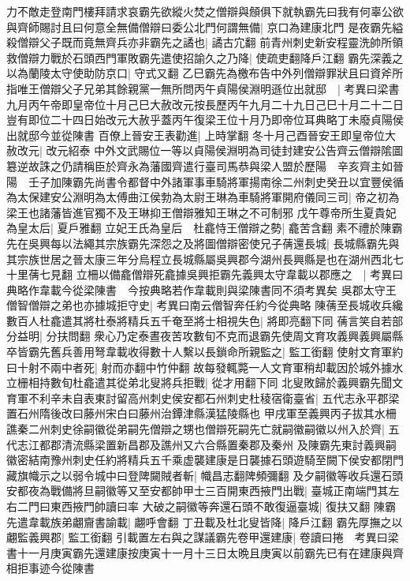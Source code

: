 力不敵走登南門樓拜請求哀霸先欲縱火焚之僧辯與頠俱下就執霸先曰我有何辜公欲與齊師賜討且曰何意全無備僧辯曰委公北門何謂無備|{
	京口為建康北門}
是夜霸先縊殺僧辯父子既而竟無齊兵亦非霸先之譎也|{
	譎古宂翻}
前青州刺史新安程靈洗帥所領救僧辯力戰於石頭西門軍敗霸先遣使招諭久之乃降|{
	使疏吏翻降戶江翻}
霸先深義之以為蘭陵太守使助防京口|{
	守式又翻}
乙巳霸先為檄布告中外列僧辯罪狀且曰資斧所指唯王僧辯父子兄弟其餘親黨一無所問丙午貞陽侯淵明遜位出就邸　|{
	考異曰梁書九月丙午帝即皇帝位十月己巳大赦改元按長歷丙午九月二十九日己巳十月二十二日豈有即位二十四日始改元大赦乎蓋丙午復梁王位十月乃即帝位耳典略丁未廢貞陽侯出就邸今並從陳書}
百僚上晉安王表勸進|{
	上時掌翻}
冬十月己酉晉安王即皇帝位大赦改元|{
	改元紹泰}
中外文武賜位一等以貞陽侯淵明為司徒封建安公告齊云僧辯隂圖簒逆故誅之仍請稱臣於齊永為藩國齊遣行臺司馬恭與梁人盟於歷陽　辛亥齊主如晉陽　壬子加陳霸先尚書令都督中外諸軍事車騎將軍揚南徐二州刺史癸丑以宜豐侯循為太保建安公淵明為太傅曲江侯勃為太尉王琳為車騎將軍開府儀同三司|{
	帝之初為梁王也諸藩皆進官獨不及王琳抑王僧辯雅知王琳之不可制邪}
戊午尊帝所生夏貴妃為皇太后|{
	夏戶雅翻}
立妃王氏為皇后　杜龕恃王僧辯之勢|{
	龕苦含翻}
素不禮於陳霸先在吳興每以法繩其宗族霸先深怨之及將圖僧辯密使兄子蒨還長城|{
	長城縣霸先與其宗族世居之晉太康三年分烏程立長城縣屬吳興郡今湖州長興縣是也在湖州西北七十里蒨七見翻}
立柵以備龕僧辯死龕據吳興拒霸先義興太守韋載以郡應之　|{
	考異曰典略作韋載今從梁陳書　今按典略若作韋載則與梁陳書同不須考異矣}
吳郡太守王僧智僧辯之弟也亦據城拒守史|{
	考異曰南云僧智奔任約今從典略}
陳蒨至長城收兵纔數百人杜龕遣其將杜泰將精兵五千奄至將士相視失色|{
	將即亮翻下同}
蒨言笑自若部分益明|{
	分扶問翻}
衆心乃定泰晝夜苦攻數旬不克而退霸先使周文育攻義興義興屬縣卒皆霸先舊兵善用弩韋載收得數十人繫以長鎖命所親監之|{
	監工銜翻}
使射文育軍約曰十射不兩中者死|{
	射而亦翻中竹仲翻}
故每發輒斃一人文育軍稍却載因於城外據水立栅相持數旬杜龕遣其從弟北叟將兵拒戰|{
	從才用翻下同}
北叟敗歸於義興霸先聞文育軍不利辛未自表東討留高州刺史侯安都石州刺史杜稜宿衛臺省|{
	五代志永平郡梁置石州隋後改曰藤州宋白曰藤州治鐔津縣漢猛陵縣也}
甲戌軍至義興丙子拔其水柵譙秦二州刺史徐嗣徽從弟嗣先僧辯之甥也僧辯死嗣先亡就嗣徽嗣徽以州入於齊|{
	五代志江都郡清流縣梁置新昌郡及譙州又六合縣置秦郡及秦州}
及陳霸先東討義興嗣徽密結南豫州刺史任約將精兵五千乘虚襲建康是日襲據石頭遊騎至闕下侯安都閉門藏旗幟示之以弱令城中曰登陴闚賊者斬|{
	幟昌志翻陴頻彌翻}
及夕嗣徽等收兵還石頭安都夜為戰備將旦嗣徽等又至安都帥甲士三百開東西掖門出戰|{
	臺城正南端門其左右二門曰東西掖門帥讀曰率}
大破之嗣徽等奔還石頭不敢復逼臺城|{
	復扶又翻}
陳霸先遣韋載族弟翽齎書諭載|{
	翽呼會翻}
丁丑載及杜北叟皆降|{
	降戶江翻}
霸先厚撫之以翽監義興郡|{
	監工銜翻}
引載置左右與之謀議霸先卷甲還建康|{
	卷讀曰捲　考異曰梁書十一月庚寅霸先還建康按庚寅十一月十三日太晩且庚寅以前霸先已有在建康與齊相拒事迹今從陳書}
